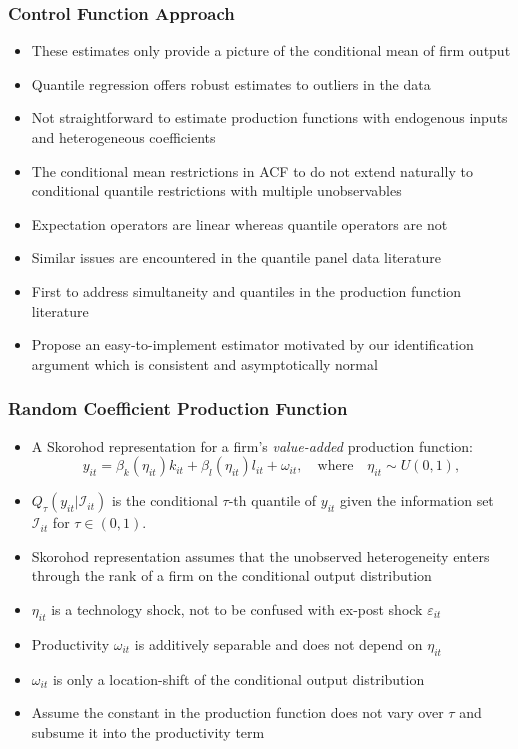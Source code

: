\documentclass[xcolor={dvipsnames}, notheorems]{beamer}
\theoremstyle{plain}
\begin{document}
\begin{frame}
\frametitle{Control Function Approach}
\begin{itemize}
\item These estimates only provide a picture of the conditional mean of firm output
\item Quantile regression offers robust estimates to outliers in the data
\item Not straightforward to estimate production functions with endogenous inputs and heterogeneous coefficients
\item The conditional mean restrictions in ACF to do not extend naturally to conditional quantile restrictions with multiple unobservables
\item Expectation operators are linear whereas quantile operators are not
\item Similar issues are encountered in the quantile panel data literature
\item  First to address simultaneity and quantiles in the production function literature
\item Propose an easy-to-implement estimator motivated by our identification argument which is consistent and asymptotically normal
\end{itemize}
\end{frame}


\begin{frame}
\frametitle{Random Coefficient Production Function}
\begin{itemize}
\item A Skorohod representation for a firm's \textit{value-added} production function:
\begin{equation} \label{pfrc}
    y_{it}=\beta_{k}(\eta_{it})k_{it}+\beta_{l}(\eta_{it})l_{it}+\omega_{it}, \quad \text{where}\quad \eta_{it}\sim U(0,1),
\end{equation}
\item $Q_{\tau}(y_{it}|\mathcal{I}_{it})$ is the conditional $\tau$-th quantile of $y_{it}$ given the information set $\mathcal{I}_{it}$ for $\tau\in(0,1)$.
\item Skorohod representation assumes that the unobserved heterogeneity enters through the rank of a firm on the conditional output distribution
\item $\eta_{it}$ is a technology shock, not to be confused with ex-post shock $\varepsilon_{it}$
\item Productivity $\omega_{it}$ is additively separable and does not depend on $\eta_{it}$
\item $\omega_{it}$ is only a location-shift of the conditional output distribution
\item Assume the constant in the production function does not vary over $\tau$ and subsume it into the productivity term
\end{itemize}
\end{frame}
\end{document}
